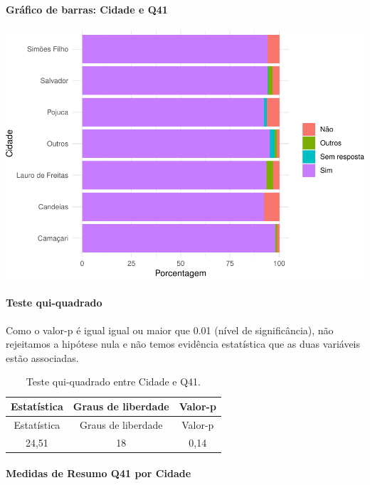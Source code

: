 \documentclass[]{article}
\let\oldparagraph\paragraph
\renewcommand{\paragraph}[1]{\oldparagraph{#1}\mbox{}}
\begin{document}
\hypertarget{gruxe1fico-de-barras-cidade-e-q41}{%
\paragraph{Gráfico de barras: Cidade e Q41}\label{gruxe1fico-de-barras-cidade-e-q41}}

\begin{center}\includegraphics[width=0.75\linewidth]{relatorio_covid19_files/figure-latex/unnamed-chunk-1606-1} \end{center}

\hypertarget{teste-qui-quadrado-137}{%
\paragraph{Teste qui-quadrado}\label{teste-qui-quadrado-137}}

Como o valor-p é igual igual ou maior que 0.01 (nível de significância), não rejeitamos a hipótese nula e não temos evidência estatística que as duas variáveis estão associadas.

\begin{longtable}[]{@{}ccc@{}}
\caption{\label{tab:unnamed-chunk-1608}Teste qui-quadrado entre Cidade e Q41.}\tabularnewline
\toprule
Estatística & Graus de liberdade & Valor-p\tabularnewline
\midrule
\endfirsthead
\toprule
Estatística & Graus de liberdade & Valor-p\tabularnewline
\midrule
\endhead
24,51 & 18 & 0,14\tabularnewline
\bottomrule
\end{longtable}

\cleardoublepage

\hypertarget{medidas-de-resumo-q41-por-cidade}{%
\paragraph{Medidas de Resumo Q41 por Cidade}\label{medidas-de-resumo-q41-por-cidade}}
\end{document}
